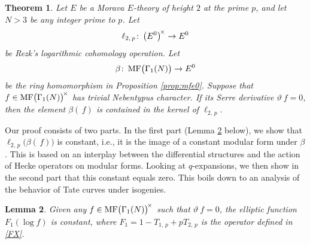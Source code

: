 \documentclass{gtpart}
\newtheorem{thm}{Theorem}
\newtheorem{lem}[thm]{Lemma}
\theoremstyle{definition}
\theoremstyle{remark}
\def\co{\colon\thinspace}
\newcommand{\MF}{{\rm MF}}
\newcommand{\B}{\beta}
\newcommand{\G}{\Gamma}
\renewcommand{\=}{\approx}
\renewcommand{\-}{\sim}
\numberwithin{equation}{section}
\numberwithin{thm}{section}
\begin{document}
\begin{thm}
 \label{thm:kerlog}
 Let $E$ be a Morava $E$-theory of height $2$ at the prime $p$, and let $N > 3$ 
 be any integer prime to $p$.  Let 
 \[
  \ell_{2,\,p} \co \big( E^0 \big)^{\!\times} \to E^0 
 \]
 be Rezk's logarithmic cohomology operation.  Let 
 \[
  \B \co \MF\big(\G_1(N)\big) \to E^0 
 \]
 be the ring homomorphism in Proposition \ref{prop:mfe0}.  Suppose that \!\, 
 $f \in \MF\big(\G_1(N)\big)^{\!\times}$ has trivial Nebentypus character.  If 
 its Serre derivative $\vartheta ~\! f = 0$, then the element $\B(\,f)$ is 
 contained in the kernel of $\ell_{2,\,p}$.  
\end{thm}

Our proof consists of two parts.  In the first part (Lemma \ref{lem:const} 
below), we show that $\ell_{2,\,p}\big(\B(\,f)\big)$ is constant, i.e., it is 
the image of a constant modular form under $\B$.  This is based on an interplay 
between the differential structures and the action of Hecke operators on modular 
forms.  Looking at $q$-expansions, we then show in the second part that this 
constant equals zero.  This boils down to an analysis of the behavior of Tate 
curves under isogenies.  

\begin{lem}
 \label{lem:const}
 Given any $f \in \MF\big(\G_1(N)\big)^{\!\times}$ such that 
 $\vartheta ~\! f = 0$, the elliptic function $F_1(\log f)$ is constant, where 
 $F_1 = 1 - T_{1,\,p} + p T_{2,\,p}$ is the operator defined in \eqref{FX}.  
\end{lem}
\end{document}
